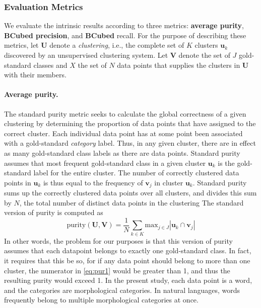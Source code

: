 {\subsubsection{Evaluation Metrics} 
\label{sec:metrics}
We evaluate the intrinsic results according to three metrics: \textbf{average purity}, \textbf{BCubed precision}, and
 \textbf{BCubed} recall. For the purpose of describing these metrics,
 let $\mathbf{U}$ denote a \emph{clustering}, i.e., the complete set of $K$ clusters $\mathbf{u}_k$
 discovered by an unsupervised clustering system. Let
 $\mathbf{V}$ denote the set of $J$ gold-standard classes and $X$ the set of $N$ data points 
 that supplies the clusters in $\mathbf{U}$ with their members. 

\paragraph{Average purity.}
The standard purity metric seeks to calculate the global correctness of a 
given clustering by determining the proportion of data points that have 
assigned to the correct cluster. Each individual data point has at some 
point been associated with a gold-standard \emph{category} label. Thus, 
in any given cluster, there are in effect as many gold-standard class 
labels as there are data points. Standard purity assumes that most frequent 
 gold-standard class in a given cluster $\mathbf{u}_k$ is the gold-standard label for the entire cluster. The number of correctly clustered data points in $\mathbf{u}_k$ is thus equal to the frequency of  $\mathbf{v}_j$ in cluster $\mathbf{u}_k$. Standard purity sums up the correctly clustered data points over all clusters, and divides this sum by $N$, the total number of distinct data points in the clustering
 The standard version of purity is computed as 
\begin{equation} \label{eq:pur1}
\text{purity}(\mathbf{U}, \mathbf{V}) = \frac{1}{N} \sum_{k \in K} \text{max}_{j \in J} |\mathbf{u}_k \cap \mathbf{v}_j|
\end{equation}
In other words, 
the problem for our purposes is that this version of purity assumes 
that each datapoint belongs to exactly one gold-standard class. In fact, it requires that this be so, for if any data point should belong to more than one cluster, the numerator in \eqref{eq:pur1} would be greater than 1, and thus the resulting purity would exceed 1.
In the present study, each data point is a word, and the categories are morphological categories. In natural languages, words frequently belong to multiple morphological categories at once.

}
